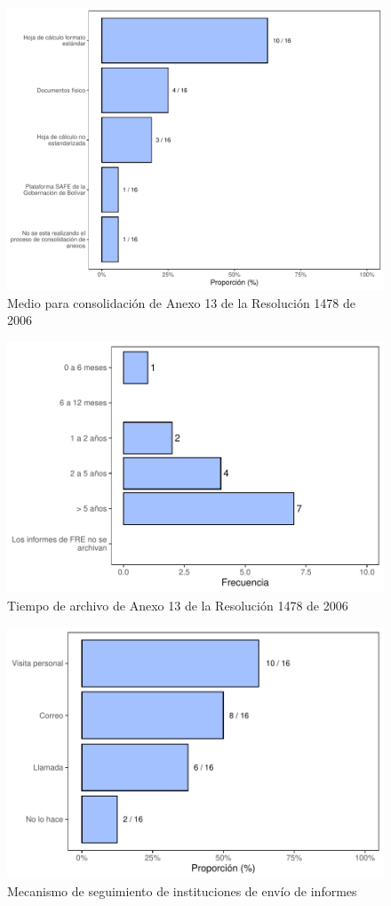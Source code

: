 \documentclass[
]{book}
\begin{document}
\begin{figure}
\includegraphics[width=0.85\linewidth]{InformeFinal_files/figure-latex/RecepcionA13-1} \caption{Medio para consolidación de Anexo 13 de la Resolución 1478 de 2006}\label{fig:RecepcionA13}
\end{figure}
\begin{figure}
\includegraphics[width=0.85\linewidth]{InformeFinal_files/figure-latex/ArchivoInformesFRE-1} \caption{Tiempo de archivo de Anexo 13 de la Resolución 1478 de 2006}\label{fig:ArchivoInformesFRE}
\end{figure}
\begin{figure}
\includegraphics[width=0.85\linewidth]{InformeFinal_files/figure-latex/SeguimientoEnvioInformes-1} \caption{Mecanismo de seguimiento de instituciones de envío de informes}\label{fig:SeguimientoEnvioInformes}
\end{figure}
\end{document}
